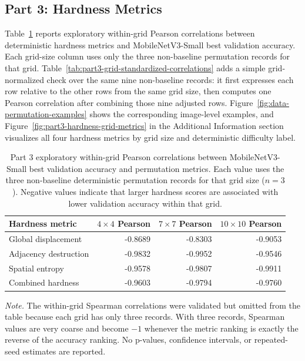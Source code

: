 \documentclass[12pt]{article}
\newcommand{\reporttablesize}{\small}
\newcommand{\reporttablenotesize}{\small}
\begin{document}
\subsection{Part 3: Hardness Metrics}
\label{sec:part3-results}

Table~\ref{tab:part3-correlations} reports exploratory within-grid Pearson correlations between deterministic hardness metrics and MobileNetV3-Small best validation accuracy. Each grid-size column uses only the three non-baseline permutation records for that grid. Table~\ref{tab:part3-grid-standardized-correlations} adds a simple grid-normalized check over the same nine non-baseline records: it first expresses each row relative to the other rows from the same grid size, then computes one Pearson correlation after combining those nine adjusted rows. Figure~\ref{fig:data-permutation-examples} shows the corresponding image-level examples, and Figure~\ref{fig:part3-hardness-grid-metrics} in the Additional Information section visualizes all four hardness metrics by grid size and deterministic difficulty label.

\begin{table}[t]
  \centering
  \reporttablesize
  \begin{tabular}{lrrr}
    \toprule
    \textbf{Hardness metric} & \textbf{$4 \times 4$ Pearson} & \textbf{$7 \times 7$ Pearson} & \textbf{$10 \times 10$ Pearson} \\
    \midrule
    Global displacement & -0.8689 & -0.8303 & -0.9053 \\
    Adjacency destruction & -0.9832 & -0.9952 & -0.9546 \\
    Spatial entropy & -0.9578 & -0.9807 & -0.9911 \\
    Combined hardness & -0.9603 & -0.9794 & -0.9760 \\
    \bottomrule
  \end{tabular}
  \caption{Part 3 exploratory within-grid Pearson correlations between MobileNetV3-Small best validation accuracy and permutation metrics. Each value uses the three non-baseline deterministic permutation records for that grid size ($n=3$). Negative values indicate that larger hardness scores are associated with lower validation accuracy within that grid.}
  \label{tab:part3-correlations}
  \begin{flushleft}
  \reporttablenotesize\emph{Note.} The within-grid Spearman correlations were validated but omitted from the table because each grid has only three records. With three records, Spearman values are very coarse and become $-1$ whenever the metric ranking is exactly the reverse of the accuracy ranking. No p-values, confidence intervals, or repeated-seed estimates are reported.
  \end{flushleft}
\end{table}
\end{document}
